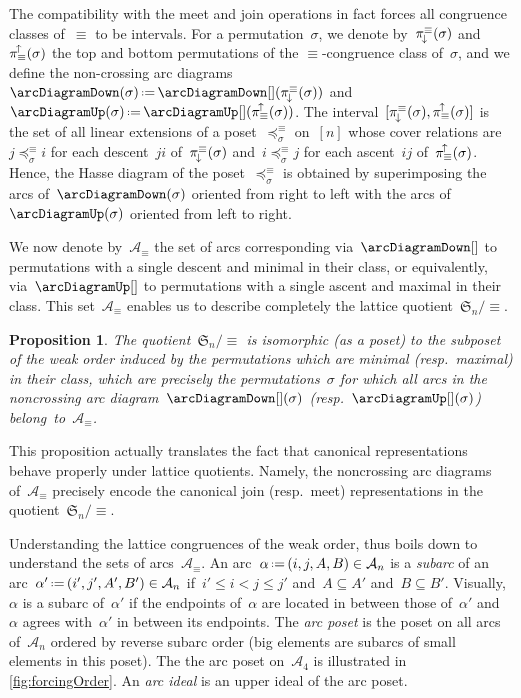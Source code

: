 \documentclass{amsart}
\newtheorem{proposition}[theorem]{Proposition}
\theoremstyle{definition}
\newcommand{\f}[1]{{\mathfrak{#1}}} %
\newcommand{\ssm}{\smallsetminus} %
\newcommand{\eqdef}{\mbox{\,\raisebox{0.2ex}{\scriptsize\ensuremath{\mathrm:}}\ensuremath{=}\,}} %
\newcommand{\darkblue}{\color{darkblue}} %
\newcommand{\defn}[1]{\textsl{\darkblue #1}} %
\newcommand{\arc}{\alpha} %
\newcommand{\arcs}{{\mathcal{A}}} %
\newcommand{\nonarcs}{{\mathcal{B}}} %
\newcommand{\projDown}{\smash{\pi^{\equiv}_{\!\downarrow\!}}} %
\newcommand{\projUp}{\smash{\pi_{\equiv}^{\!\uparrow\!}}} %
\begin{document}
The compatibility with the meet and join operations in fact forces all congruence classes of~$\equiv$ to be intervals.
For a permutation~$\sigma$, we denote by~$\projDown(\sigma)$ and~$\projUp(\sigma)$ the top and bottom permutations of the $\equiv$-congruence class of~$\sigma$, and we define the non-crossing arc diagrams~$\arcDiagramDown(\sigma) \eqdef \arcDiagramDown[](\projDown(\sigma))$ and~$\arcDiagramUp(\sigma) \eqdef \arcDiagramUp[](\projUp(\sigma))$.
The interval~$[\projDown(\sigma), \projUp(\sigma)]$ is the set of all linear extensions of a poset~$\preccurlyeq^\equiv_\sigma$ on~$[n]$ whose cover relations are~$j \preccurlyeq^\equiv_\sigma i$ for each descent~$ji$ of~$\projDown(\sigma)$ and~$i \preccurlyeq^\equiv_\sigma j$ for each ascent~$ij$ of~$\projUp(\sigma)$.
Hence, the Hasse diagram of the poset~$\preccurlyeq^\equiv_\sigma$ is obtained by superimposing the arcs of~$\arcDiagramDown(\sigma)$ oriented from right to left with the arcs of~$\arcDiagramUp(\sigma)$ oriented from left to right.

We now denote by~$\arcs_\equiv$ the set of arcs corresponding via~$\arcDiagramDown[]$ to permutations with a single descent and minimal in their class, or equivalently, via~$\arcDiagramUp[]$ to permutations with a single ascent and maximal in their class.
This set~$\arcs_\equiv$ enables us to describe completely the lattice quotient~$\f{S}_n / {\equiv}$.

\begin{proposition}
The quotient~$\f{S}_n/{\equiv}$ is isomorphic (as a poset) to the subposet of the weak order induced by the permutations which are minimal (resp.~maximal) in their class, which are precisely the permutations~$\sigma$ for which all arcs in the noncrossing arc diagram~$\arcDiagramDown[](\sigma)$ (resp.~$\arcDiagramUp[](\sigma)$) belong~to~$\arcs_\equiv$.
\end{proposition}

This proposition actually translates the fact that canonical representations behave properly under lattice quotients.
Namely, the noncrossing arc diagrams of~$\arcs_\equiv$ precisely encode the canonical join (resp.~meet) representations in the quotient~$\f{S}_n/{\equiv}$.

Understanding the lattice congruences of the weak order, thus boils down to understand the sets of arcs~$\arcs_\equiv$.
An arc~$\arc \eqdef (i, j, A, B) \in \arcs_n$ is a \defn{subarc} of an arc~$\arc' \eqdef (i', j', A', B') \in \arcs_n$ if~$i' \le i < j \le j'$ and~${A \subseteq A'}$ and~${B \subseteq B'}$.
Visually, $\arc$ is a subarc of~$\arc'$ if the endpoints of~$\arc$ are located in between those of~$\arc'$ and~$\arc$ agrees with~$\arc'$ in between its endpoints.
The \defn{arc poset} is the poset on all arcs of~$\arcs_n$ ordered by reverse subarc order (big elements are subarcs of small elements in this poset).
The the arc poset on~$\arcs_4$ is illustrated in \cref{fig:forcingOrder}.
An \defn{arc ideal} is an upper ideal of the arc poset.
\end{document}
